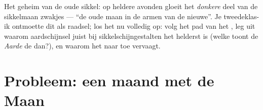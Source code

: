 \begin{exercise}[$\star\star\star$]\label{exo:g7:moon-phases:12}
Het geheim van de oude sikkel: op heldere avonden gloeit het
\emph{donkere} deel van de sikkelmaan zwakjes --- ``de oude maan in de
armen van de nieuwe''. Je tweedeklas-ik ontmoette dit als raadsel; los
het nu volledig op: volg het pad van het , leg uit waarom
aardschijnsel juist bij sikkelschijngestalten het helderst is
(welke  toont de \emph{Aarde} de  dan?), en
waarom het naar  toe vervaagt.
\end{exercise}

\section{Probleem: een maand met de Maan}

